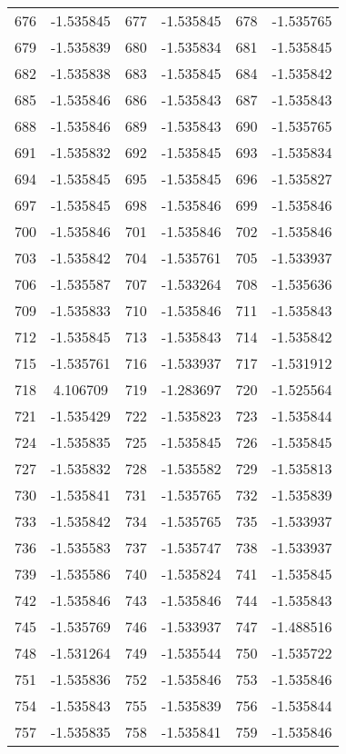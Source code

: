 \documentclass[12pt]{article}
\begin{document}
\begin{longtable}{@{}cc|cc|cc@{}}
676 & -1.535845 & 677 & -1.535845 & 678 & -1.535765 \\
679 & -1.535839 & 680 & -1.535834 & 681 & -1.535845 \\
682 & -1.535838 & 683 & -1.535845 & 684 & -1.535842 \\
685 & -1.535846 & 686 & -1.535843 & 687 & -1.535843 \\
688 & -1.535846 & 689 & -1.535843 & 690 & -1.535765 \\
691 & -1.535832 & 692 & -1.535845 & 693 & -1.535834 \\
694 & -1.535845 & 695 & -1.535845 & 696 & -1.535827 \\
697 & -1.535845 & 698 & -1.535846 & 699 & -1.535846 \\
700 & -1.535846 & 701 & -1.535846 & 702 & -1.535846 \\
703 & -1.535842 & 704 & -1.535761 & 705 & -1.533937 \\
706 & -1.535587 & 707 & -1.533264 & 708 & -1.535636 \\
709 & -1.535833 & 710 & -1.535846 & 711 & -1.535843 \\
712 & -1.535845 & 713 & -1.535843 & 714 & -1.535842 \\
715 & -1.535761 & 716 & -1.533937 & 717 & -1.531912 \\
718 & 4.106709 & 719 & -1.283697 & 720 & -1.525564 \\
721 & -1.535429 & 722 & -1.535823 & 723 & -1.535844 \\
724 & -1.535835 & 725 & -1.535845 & 726 & -1.535845 \\
727 & -1.535832 & 728 & -1.535582 & 729 & -1.535813 \\
730 & -1.535841 & 731 & -1.535765 & 732 & -1.535839 \\
733 & -1.535842 & 734 & -1.535765 & 735 & -1.533937 \\
736 & -1.535583 & 737 & -1.535747 & 738 & -1.533937 \\
739 & -1.535586 & 740 & -1.535824 & 741 & -1.535845 \\
742 & -1.535846 & 743 & -1.535846 & 744 & -1.535843 \\
745 & -1.535769 & 746 & -1.533937 & 747 & -1.488516 \\
748 & -1.531264 & 749 & -1.535544 & 750 & -1.535722 \\
751 & -1.535836 & 752 & -1.535846 & 753 & -1.535846 \\
754 & -1.535843 & 755 & -1.535839 & 756 & -1.535844 \\
757 & -1.535835 & 758 & -1.535841 & 759 & -1.535846 \\

\end{longtable}
\end{document}
